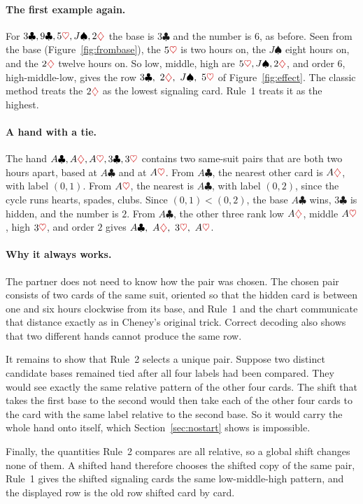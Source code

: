 \documentclass[11pt]{article}
\newcommand{\cl}{\ensuremath{\clubsuit}}
\newcommand{\di}{\textcolor{red!80!black}{\ensuremath{\diamondsuit}}}
\newcommand{\he}{\textcolor{red!80!black}{\ensuremath{\heartsuit}}}
\newcommand{\spd}{\ensuremath{\spadesuit}}
\begin{document}
\paragraph{The first example again.}
For $3\cl,9\cl,5\he,J\spd,2\di$ the base is $3\cl$ and the number is $6$, as before. Seen from the base (Figure~\ref{fig:frombase}), the $5\he$ is two hours on, the $J\spd$ eight hours on, and the $2\di$ twelve hours on. So low, middle, high are $5\he,J\spd,2\di$, and order $6$, high-middle-low, gives the row $3\cl,\ 2\di,\ J\spd,\ 5\he$ of Figure~\ref{fig:effect}. The classic method treats the $2\di$ as the lowest signaling card. Rule~1 treats it as the highest.

\paragraph{A hand with a tie.}
The hand $A\cl,A\di,A\he,3\cl,3\he$ contains two same-suit pairs that are both two hours apart, based at $A\cl$ and at $A\he$. From $A\cl$, the nearest other card is $A\di$, with label $(0,1)$. From $A\he$, the nearest is $A\cl$, with label $(0,2)$, since the cycle runs hearts, spades, clubs. Since $(0,1)<(0,2)$, the base $A\cl$ wins, $3\cl$ is hidden, and the number is $2$. From $A\cl$, the other three rank low $A\di$, middle $A\he$, high $3\he$, and order $2$ gives $A\cl,\ A\di,\ 3\he,\ A\he$.


\paragraph{Why it always works.}
The partner does not need to know how the pair was chosen. The chosen pair consists of two cards of the same suit, oriented so that the hidden card is between one and six hours clockwise from its base, and Rule~1 and the chart communicate that distance exactly as in Cheney's original trick. Correct decoding also shows that two different hands cannot produce the same row.

It remains to show that Rule~2 selects a unique pair. Suppose two distinct candidate bases remained tied after all four labels had been compared. They would see exactly the same relative pattern of the other four cards. 
The shift that takes the first base to the second would then take each of the other four cards to the card with the same label relative to the second base. So it would carry the whole hand onto itself, which Section~\ref{sec:nostart} shows is impossible.


Finally, the quantities Rule~2 compares are all relative, so a global shift changes none of them. A shifted hand therefore chooses the shifted copy of the same pair, Rule~1 gives the shifted signaling cards the same low-middle-high pattern, and the displayed row is the old row shifted card by card.
\end{document}
